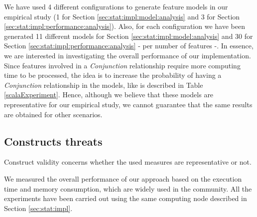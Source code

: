 We have used 4 different configurations to generate feature models in our empirical study (1 for Section \ref{sec:stat:impl:model:analysis} and 3 for Section \ref{sec:stat:impl:performance:analysis}).
Also, for each configuration we have been generated 11 different models for Section \ref{sec:stat:impl:model:analysis} and 30 for Section \ref{sec:stat:impl:performance:analysis} - per number of features -. In essence, we are interested in investigating the overall performance of our implementation. Since features involved in a \textit{Conjunction} relationship require more computing time to be processed, the idea is to increase the probability of having a \textit{Conjunction} relationship in the models, like is described in Table \ref{scalaExperiment}. Hence, although we believe that these models are representative for our empirical study, we cannot guarantee that the same results are obtained for other scenarios.


\subsection{Constructs threats}

Construct validity concerns whether the used measures are representative or not.

We measured the overall performance of our approach based on the execution time and memory consumption,
which are widely used in the community. All the experiments have been carried out using the same computing node described in Section \ref{sec:stat:impl}.



